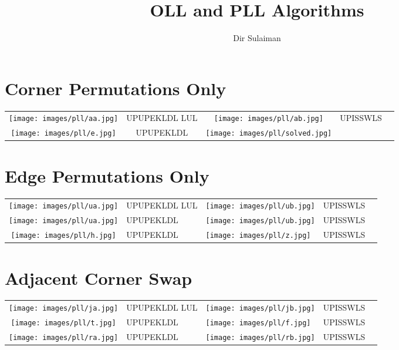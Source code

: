 \documentclass{article}
\title{OLL and PLL Algorithms}
\author{Dir Sulaiman}
\begin{document}
    \begin{multicols}{2}

        \section*{Corner Permutations Only}
        \begin{tabular}{|c|c|c|c|l}
            \centering
            \texttt{[image: images/pll/aa.jpg]} & UPUPEKLDL LUL & \texttt{[image: images/pll/ab.jpg]} & UPISSWLS\\
            \texttt{[image: images/pll/e.jpg]} & UPUPEKLDL & \texttt{[image: images/pll/solved.jpg]} &  \\
        \end{tabular}

        \section*{Edge Permutations Only}
        \begin{tabular}{|c|ll|c|l} %
            \centering
            \texttt{[image: images/pll/ua.jpg]} & UPUPEKLDL LUL & \texttt{[image: images/pll/ub.jpg]} & UPISSWLS\\
            \texttt{[image: images/pll/ua.jpg]} & UPUPEKLDL & \texttt{[image: images/pll/ub.jpg]} & UPISSWLS\\
            \texttt{[image: images/pll/h.jpg]} & UPUPEKLDL & \texttt{[image: images/pll/z.jpg]} & UPISSWLS\\
        \end{tabular}

        \section*{Adjacent Corner Swap}
        \begin{tabular}{|c|ll|c|l} %
            \centering
            \texttt{[image: images/pll/ja.jpg]} & UPUPEKLDL LUL & \texttt{[image: images/pll/jb.jpg]} & UPISSWLS\\
            \texttt{[image: images/pll/t.jpg]} & UPUPEKLDL & \texttt{[image: images/pll/f.jpg]} & UPISSWLS\\
            \texttt{[image: images/pll/ra.jpg]} & UPUPEKLDL & \texttt{[image: images/pll/rb.jpg]} & UPISSWLS\\
        \end{tabular}


\end{multicols}
\end{document}
